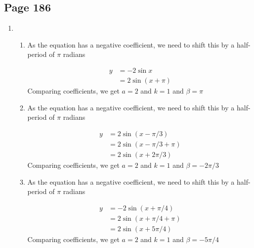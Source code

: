 \documentclass{article}
\newenvironment{solutions}[1]
{\subsection*{#1}
 \begin{enumerate}[leftmargin=1.5em]}
{\end{enumerate}}
\newcommand{\solution}{\item}
\newenvironment{subsolutions}
{\begin{enumerate}}
{\end{enumerate}}
\newcommand{\subsolution}{\item}
\begin{document}
\begin{solutions}{Page 186}
\begin{subsolutions}
\subsolution
\begin{align*}
    \cos \left( x+k\pi/2  \right) &= \cos \left( x+ \frac{\pi(4n+3)}{2}\right) \\
          &= \cos \left( x+ 2n\pi + \frac{3\pi}{2} \right)\\
          &= \cos (x+ \frac{3\pi}{2})\\
          &= \cos (x - \frac{\pi}{2})\\
          &= \sin x
\end{align*}

\subsolution
\begin{align*}
    \cos \left( x+k\pi/2  \right) &= \cos \left( x+ \frac{\pi(4n)}{2}\right) \\
          &= \cos \left( x+ 2n\pi\right)\\
          &= \cos x
\end{align*}

\end{subsolutions}
\solution

\begin{subsolutions}
\subsolution
As the equation has a negative coefficient, we need to shift this by a half-period of $\pi$ radians

\begin{align*}
    y&=-2 \sin x\\
    &= 2 \sin (x + \pi)
\end{align*}
Comparing coefficients, we get $a=2$ and $k=1$ and $\beta=\pi$

\subsolution
As the equation has a negative coefficient, we need to shift this by a half-period of $\pi$ radians

\begin{align*}
    y&=2 \sin (x-\pi/3)\\
    &= 2 \sin (x -\pi/3+ \pi)\\
    &= 2 \sin (x +2\pi/3)
\end{align*}
Comparing coefficients, we get $a=2$ and $k=1$ and $\beta=-2\pi/3$

\subsolution
As the equation has a negative coefficient, we need to shift this by a half-period of $\pi$ radians

\begin{align*}
    y&=-2 \sin (x+\pi/4)\\
    &= 2 \sin (x +\pi/4+ \pi)\\
    &= 2 \sin (x +5\pi/4)
\end{align*}
Comparing coefficients, we get $a=2$ and $k=1$ and $\beta=-5\pi/4$


\end{subsolutions}
\end{solutions}
\end{document}
